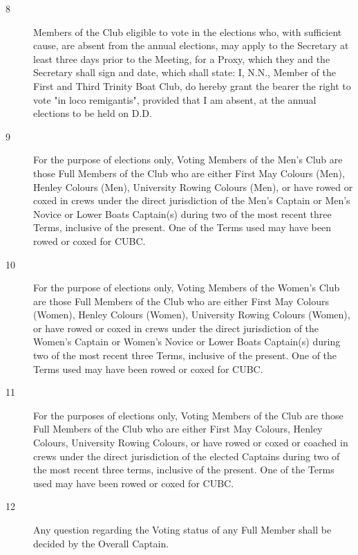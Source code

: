\documentclass{article}
\begin{document}
\begin{description}
\begin{description}
		\item[8] Members of the Club eligible to vote in the elections who, with sufficient
		cause, are absent from the annual elections, may apply to the Secretary at least
		three days prior to the Meeting, for a Proxy, which they and the Secretary shall
		sign and date, which shall state: I, N.N., Member of the First and Third Trinity
		Boat Club, do hereby grant the bearer the right to vote "in loco remigantis",
		provided that I am absent, at the annual elections to be held on D.D.\\
		
		\item[9] For the purpose of elections only, Voting Members of the Men's Club are those
		Full Members of the Club who are either First May Colours (Men), Henley
		Colours (Men), University Rowing Colours (Men), or have rowed or coxed in
		crews under the direct jurisdiction of the Men's Captain or Men's Novice or
		Lower Boats Captain(s) during two of the most recent three Terms, inclusive
		of the present. One of the Terms used may have been rowed or coxed for CUBC.\\
		
		\item[10] For the purpose of elections only, Voting Members of the Women’s Club are
		those Full Members of the Club who are either First May Colours (Women),
		Henley Colours (Women), University Rowing Colours (Women), or have
		rowed or coxed in crews under the direct jurisdiction of the Women’s Captain
		or Women’s Novice or Lower Boats Captain(s) during two of the most recent
		three Terms, inclusive of the present. One of the Terms used may have been
		rowed or coxed for CUBC.\\
		
		\item[11] For the purposes of elections only, Voting Members of the Club are those Full
		Members of the Club who are either First May Colours, Henley Colours,
		University Rowing Colours, or have rowed or coxed or coached in crews
		under the direct jurisdiction of the elected Captains during two of the most
		recent three terms, inclusive of the present. One of the Terms used may have
		been rowed or coxed for CUBC.\\
		
		\item[12] Any question regarding the Voting status of any Full Member shall be decided
		by the Overall Captain.\\
		

\end{description}
\end{description}
\end{document}
